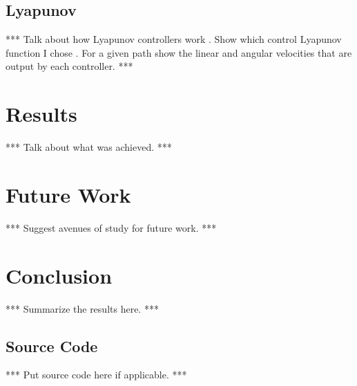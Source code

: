 \documentclass[12pt]{report}
\begin{document}
\begin{spacing}{1.1}
\section{Lyapunov}
*** Talk about how Lyapunov controllers work \cite{Khalil02}. Show which control Lyapunov function I chose \cite{Rusu05RobotuxLyapunov}. For a given path show the linear and angular velocities that are output by each controller. ***
\clearpage

\chapter{Results}
*** Talk about what was achieved. ***
\clearpage

\chapter{Future Work}
*** Suggest avenues of study for future work. ***
\clearpage

\chapter{Conclusion}
*** Summarize the results here. ***
\clearpage

\begin{appendices}
\chapter{Source Code}
*** Put source code here if applicable. ***
\end{appendices}
\clearpage
\end{spacing}


% 
% 

\clearpage
\end{document}
